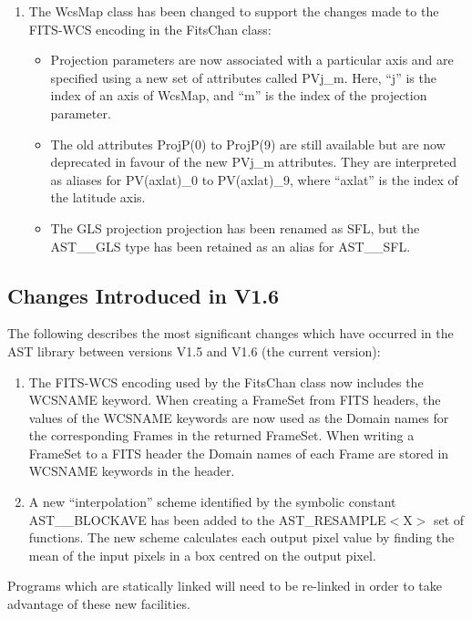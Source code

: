 \documentclass[twoside,11pt]{article}
\newcommand{\xlabel}[1]{}
\begin{document}
\begin{enumerate}
\item The WcsMap class has been changed to support the changes made to the
FITS-WCS encoding in the FitsChan class:
\begin{itemize}
\item Projection parameters are now associated with a particular axis and
are specified using a new set of attributes called PVj\_m. Here, ``j'' is 
the index of an axis of WcsMap, and ``m'' is the index of the projection 
parameter.
\item The old attributes ProjP(0) to ProjP(9) are still available but are
now deprecated in favour of the new PVj\_m attributes. They are interpreted 
as aliases for PV(axlat)\_0 to PV(axlat)\_9, where ``axlat'' is the index of 
the latitude axis.
\item The GLS projection projection has been renamed as SFL, but the 
AST\_\_GLS type has been retained as an alias for AST\_\_SFL.
\end{itemize}

\end{enumerate}

\subsection{\xlabel{changes}\xlabel{list_of_most_recent_changes}Changes
Introduced in V1.6}

The following describes the most significant changes which have
occurred in the AST library between versions V1.5 and V1.6 (the
current version):

\begin{enumerate}

\item The FITS-WCS encoding used by the FitsChan class now includes the
WCSNAME keyword. When creating a FrameSet from FITS headers, the values of 
the WCSNAME keywords are now used as the Domain names for the corresponding 
Frames in the returned FrameSet. When writing a FrameSet to a FITS header
the Domain names of each Frame are stored in WCSNAME keywords in the
header.

\item A new ``interpolation'' scheme identified by the symbolic constant
AST\_\_BLOCKAVE has been added to the AST\_RESAMPLE$<$X$>$ set of
functions. The new scheme calculates each output pixel value by finding
the mean of the input pixels in a box centred on the output pixel.

\end{enumerate}

Programs which are statically linked will need to be re-linked in
order to take advantage of these new facilities.
\end{document}
